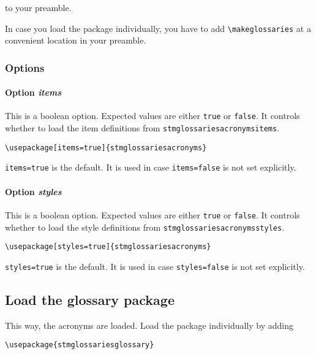 \documentclass[%
  type=article,%
  layout=koma,%
  hyperref=true,%
  conditionallox=true,%
  conditionalloxnewpage=false,%
  date=true,%
  index=true,%
  listings=true%
]{stmtext}
\begin{document}
to your preamble.

In case you load the package individually, you have to add \texttt{\textbackslash makeglossaries} at a convenient location in your preamble.

\subsubsection{Options}

\paragraph{Option \protect\textit{items}}

This is a boolean option. Expected values are either \texttt{true} or \texttt{false}. It controls whether to load the item definitions from \texttt{stmglossariesacronymsitems}.

\begin{verbatim}
\usepackage[items=true]{stmglossariesacronyms}
\end{verbatim}

\texttt{items=true} is the default. It is used in case \texttt{items=false} is not set explicitly.

\paragraph{Option \protect\textit{styles}}

This is a boolean option. Expected values are either \texttt{true} or \texttt{false}. It controls whether to load the style definitions from \texttt{stmglossariesacronymsstyles}.

\begin{verbatim}
\usepackage[styles=true]{stmglossariesacronyms}
\end{verbatim}

\texttt{styles=true} is the default. It is used in case \texttt{styles=false} is not set explicitly.

\subsection{Load the glossary package}
\label{sec:usage:preamble:glossary}

This way, the acronyms are loaded. Load the package individually by adding

\begin{verbatim}
\usepackage{stmglossariesglossary}
\end{verbatim}
\end{document}
